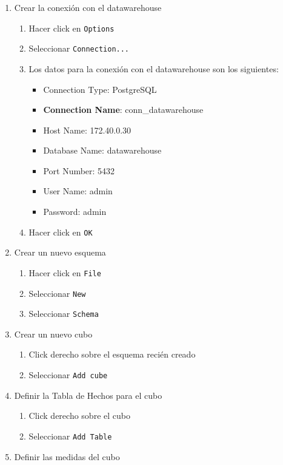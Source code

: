 \begin{enumerate}
    \item Crear la conexión con el datawarehouse
    \begin{enumerate}
        \item Hacer click en \texttt{Options}
        \item Seleccionar \texttt{Connection...}
        \item Los datos para la conexión con el datawarehouse son los siguientes:
        \begin{itemize}
            \item Connection Type: PostgreSQL
            \item \textbf{Connection Name}: conn\_datawarehouse 
            \item Host Name: 172.40.0.30
            \item Database Name: datawarehouse
            \item Port Number: 5432
            \item User Name: admin
            \item Password: admin
        \end{itemize}
        \item Hacer click en \texttt{OK}
    \end{enumerate}
     \item Crear un nuevo esquema
    \begin{enumerate}
        \item Hacer click en \texttt{File}
        \item Seleccionar \texttt{New}
        \item Seleccionar \texttt{Schema}
    \end{enumerate}
    \item Crear un nuevo cubo
    \begin{enumerate}
        \item Click derecho sobre el esquema recién creado
        \item Seleccionar \texttt{Add cube}
    \end{enumerate}
    \item Definir la Tabla de Hechos para el cubo
    \begin{enumerate}
        \item Click derecho sobre el cubo
        \item Seleccionar \texttt{Add Table}
    \end{enumerate}
    \item Definir las medidas del cubo

\end{enumerate}
